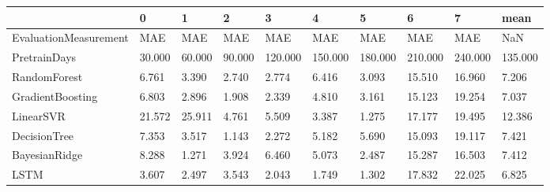 \begin{tabular}{llllllllll}
\toprule
{} &      0 &      1 &      2 &       3 &       4 &       5 &       6 &       7 &    mean \\
\midrule
EvaluationMeasurement &    MAE &    MAE &    MAE &     MAE &     MAE &     MAE &     MAE &     MAE &     NaN \\
PretrainDays          & 30.000 & 60.000 & 90.000 & 120.000 & 150.000 & 180.000 & 210.000 & 240.000 & 135.000 \\
RandomForest          &  6.761 &  3.390 &  2.740 &   2.774 &   6.416 &   3.093 &  15.510 &  16.960 &   7.206 \\
GradientBoosting      &  6.803 &  2.896 &  1.908 &   2.339 &   4.810 &   3.161 &  15.123 &  19.254 &   7.037 \\
LinearSVR             & 21.572 & 25.911 &  4.761 &   5.509 &   3.387 &   1.275 &  17.177 &  19.495 &  12.386 \\
DecisionTree          &  7.353 &  3.517 &  1.143 &   2.272 &   5.182 &   5.690 &  15.093 &  19.117 &   7.421 \\
BayesianRidge         &  8.288 &  1.271 &  3.924 &   6.460 &   5.073 &   2.487 &  15.287 &  16.503 &   7.412 \\
LSTM                  &  3.607 &  2.497 &  3.543 &   2.043 &   1.749 &   1.302 &  17.832 &  22.025 &   6.825 \\
\bottomrule
\end{tabular}
